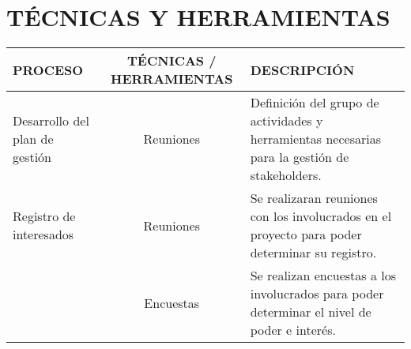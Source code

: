 \chapter{T\'ECNICAS Y HERRAMIENTAS}
%
\begin{table}[H]
	\centering
	\begin{tabular}{| m{5cm} | c | p{5cm} |}
	\hline
	\textbf{PROCESO} & \textbf{T\'ECNICAS / HERRAMIENTAS} & \textbf{DESCRIPCI\'ON} \\ \hline
	Desarrollo del plan de gesti\'on & Reuniones & Definici\'on del grupo de actividades y herramientas necesarias para la gesti\'on de stakeholders.\\
	\hline
	Registro de interesados & Reuniones & Se realizaran reuniones con los involucrados en 
	el proyecto para poder determinar su registro. \\ 
	  \cline{2-3}
	 & Encuestas & Se realizan encuestas a los involucrados para poder determinar el nivel
	 de poder e inter\'es. \\
	\hline
	\end{tabular}
\end{table}